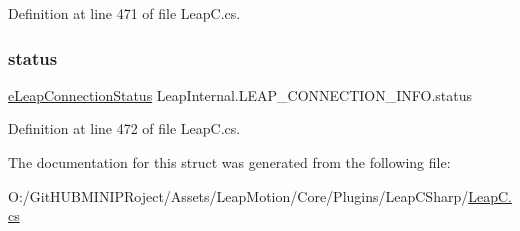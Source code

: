 Definition at line 471 of file Leap\+C.\+cs.

\mbox{\label{struct_leap_internal_1_1_l_e_a_p___c_o_n_n_e_c_t_i_o_n___i_n_f_o_a3d12b72914f3b4bf9b536a6a429cfdbc}} 
\subsubsection{\texorpdfstring{status}{status}}
{\footnotesize\ttfamily \mbox{\hyperlink{namespace_leap_internal_a98a6a4220fcab393d11bf4ec2eecdea6}{e\+Leap\+Connection\+Status}} Leap\+Internal.\+L\+E\+A\+P\+\_\+\+C\+O\+N\+N\+E\+C\+T\+I\+O\+N\+\_\+\+I\+N\+F\+O.\+status}



Definition at line 472 of file Leap\+C.\+cs.



The documentation for this struct was generated from the following file\+:\begin{DoxyCompactItemize}
\item 
O\+:/\+Git\+H\+U\+B\+M\+I\+N\+I\+P\+Roject/\+Assets/\+Leap\+Motion/\+Core/\+Plugins/\+Leap\+C\+Sharp/\mbox{\hyperlink{_leap_c_8cs}{Leap\+C.\+cs}}\end{DoxyCompactItemize}
